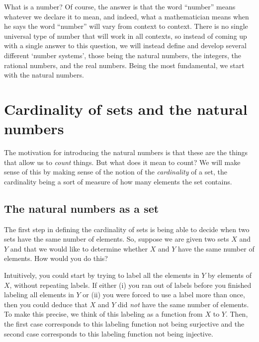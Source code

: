 What is a number?  Of course, the answer is that the word ``number'' means whatever we declare it to mean, and indeed, what a mathematician means when he says the word ``number'' will vary from context to context.  There is no single universal type of number that will work in all contexts, so instead of coming up with a single answer to this question, we will instead define and develop several different `number systems', those being the natural numbers, the integers, the rational numbers, and the real numbers.  Being the most fundamental, we start with the natural numbers.

\section{Cardinality of sets and the natural numbers}

The motivation for introducing the natural numbers is that these are the things that allow us to \emph{count} things.  But what does it mean to count?  We will make sense of this by making sense of the notion of the \emph{cardinality} of a set, the cardinality being a sort of measure of how many elements the set contains.

\subsection{The natural numbers as a set}

The first step in defining the cardinality of sets is being able to decide when two sets have the same number of elements.  So, suppose we are given two sets $X$ and $Y$ and that we would like to determine whether $X$ and $Y$ have the same number of elements.  How would you do this?

Intuitively, you could start by trying to label all the elements in $Y$ by elements of $X$, without repeating labels.  If either (i) you ran out of labels before you finished labeling all elements in $Y$ or (ii) you were forced to use a label more than once, then you could deduce that $X$ and $Y$ did \emph{not} have the same number of elements.  To make this precise, we think of this labeling as a function from $X$ to $Y$.  Then, the first case corresponds to this labeling function not being surjective and the second case corresponds to this labeling function not being injective.


